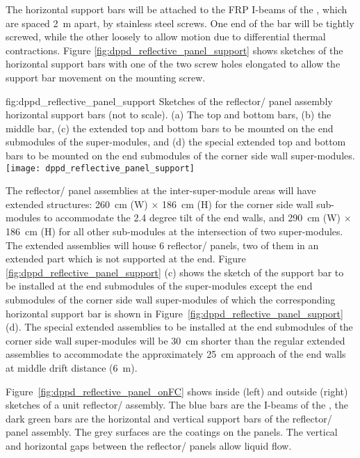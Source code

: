 The horizontal support bars will be attached to the FRP I-beams of the , which are spaced \SI{2}{\m} apart, by stainless steel screws. One end of the bar will be tightly screwed, while the other loosely to allow motion due to differential thermal contractions. Figure \ref{fig:dppd_reflective_panel_support} shows sketches of the horizontal support bars with one of the two screw holes elongated to allow the support bar movement on the mounting screw.

\begin{dunefigure}{fig:dppd_reflective_panel_support}
{Sketches of the reflector/ panel assembly horizontal support bars (not to scale). (a) The top and bottom bars, (b) the middle bar, (c) the extended top and bottom bars to be mounted on the end submodules of the  super-modules, and (d) the special extended top and bottom bars to be mounted on the end submodules of the corner  side wall super-modules.}
\texttt{[image: dppd\_reflective\_panel\_support]}
\end{dunefigure}

The reflector/ panel assemblies at the inter-super-module areas will have extended structures: \SI{260}{\cm} (W) $\times$ \SI{186}{\cm} (H) for the corner side wall  sub-modules to accommodate the \num{2.4} degree tilt of the end walls, and \SI{290}{\cm} (W) $\times$ \SI{186}{\cm} (H) for all other  sub-modules at the intersection of two  super-modules. The extended assemblies will house \num{6} reflector/ panels, two of them in an extended part which is not supported at the end. Figure \ref{fig:dppd_reflective_panel_support} (c) shows the sketch of the support bar to be installed at the end submodules of the  super-modules except the end submodules of the corner  side wall super-modules of which the corresponding horizontal support bar is shown in Figure~\ref{fig:dppd_reflective_panel_support} (d). The special extended assemblies to be installed at the end submodules of the corner side wall super-modules will be \SI{30}{\cm} shorter than the regular extended assemblies to accommodate the approximately \SI{25}{\cm} approach of the end walls at middle drift distance (\SI{6}{\m}).

Figure~\ref{fig:dppd_reflective_panel_onFC} shows inside (left) and outside (right) sketches of a unit reflector/ assembly. The blue bars are the I-beams of the , the dark green bars are the horizontal and vertical support bars of the reflector/ panel assembly. The grey surfaces are the  coatings on the panels. The vertical and horizontal gaps between the reflector/ panels allow liquid flow. 

